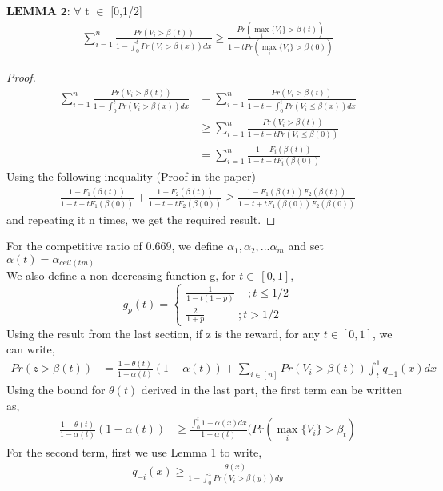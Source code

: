 \documentclass[12pt, letterpaper, twoside]{article}
\begin{document}
$\textbf{LEMMA 2:}$ $\forall$ t $\in$ [0,1/2]
\begin{align*}
\sum_{i=1}^{n} \frac{Pr(V_{i}>\beta(t))}{1-\int_{0}^{t} Pr(V_{i}>\beta(x)) dx} \geq \frac{Pr(\max_{i} \{V_{i}\} > \beta(t))}{1-tPr(\max_{i} \{V_{i}\} > \beta(0))}
\end{align*}
\begin{proof}
\begin{align*}
\sum_{i=1}^{n} \frac{Pr(V_{i}>\beta(t))}{1-\int_{0}^{t} Pr(V_{i}>\beta(x)) dx} &= \sum_{i=1}^{n} \frac{Pr(V_{i}>\beta(t))}{1-t+\int_{0}^{t} Pr(V_{i}\leq\beta(x)) dx}\\
&\geq \sum_{i=1}^{n} \frac{Pr(V_{i}>\beta(t))}{1-t+tPr(V_{i}\leq\beta(0))}\\
&=\sum_{i=1}^{n} \frac{1-F_{i}(\beta(t))}{1-t+tF_{i}(\beta(0))}
\end{align*}
Using the following inequality	 (Proof in the paper)
\begin{align*} 
\frac{1-F_{1}(\beta(t))}{1-t+tF_{1}(\beta(0))} + \frac{1-F_{2}(\beta(t))}{1-t+tF_{2}(\beta(0))} \geq \frac{1-F_{1}(\beta(t))F_{2}(\beta(t))}{1-t+tF_{1}(\beta(0))F_{2}(\beta(0))} 
\end{align*}  
and repeating it n times, we get the required result.
\end{proof}
For the competitive ratio of 0.669, we define $\alpha_{1}, \alpha_{2},...\alpha_{m}$ and set $\alpha(t) = \alpha_{ceil(tm)}$\\
We also define a non-decreasing function g, for $t \in\ [0,1]$,
$$g_{p}(t) = \begin{cases}
\frac{1}{1-t(1-p)}  \quad \,; t \leq 1/2 \\
\frac{2}{1+p} \quad \quad \quad; t > 1/2
\end{cases}
$$
Using the result from the last section, if z is the reward, for any $t \in [0,1]$, we can write,\\
\begin{align*}
Pr(z > \beta(t)) &= \frac{1-\theta(t)}{1-\alpha(t)} (1-\alpha(t)) + \sum_{i \in [n]} Pr(V_{i} > \beta(t)) \int_{t}^{1} q_{-1}(x) dx
\end{align*}
Using the bound for $\theta(t)$ derived in the last part, the first term can be written as,
\begin{align*}
 \frac{1-\theta(t)}{1-\alpha(t)} (1-\alpha(t)) &\geq \frac{\int_{0}^{t} 1 - \alpha(x) dx}{1-\alpha(t)} (Pr(\max_{i} \{V_{i}\} > \beta_{t})
\end{align*}
For the second term, first we use Lemma 1 to write,
\begin{align*}
q_{-i}(x) \geq \frac{\theta(x)}{1-\int_{0}^{x} Pr(V_{i} > \beta(y))  dy}
\end{align*}
\end{document}
